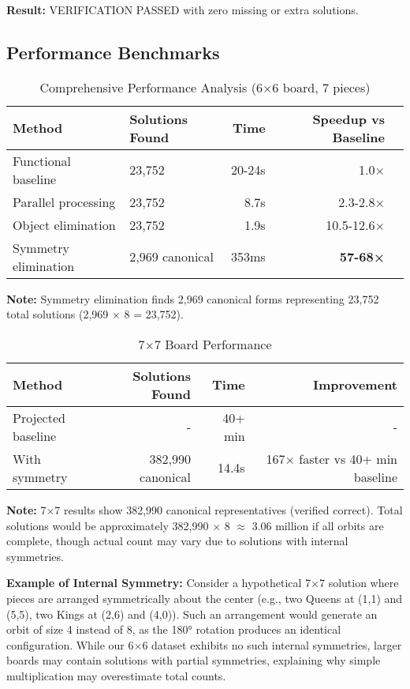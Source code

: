 \documentclass[12pt,a4paper]{article}
\theoremstyle{definition}
\begin{document}
\textbf{Result:} VERIFICATION PASSED with zero missing or extra solutions.

\subsection{Performance Benchmarks}

\begin{table}[h]
\centering
\caption{Comprehensive Performance Analysis (6$\times$6 board, 7 pieces)}
\begin{tabular}{@{}llrrr@{}}
\toprule
Method & Solutions Found & Time & Speedup vs Baseline \\
\midrule
Functional baseline & 23,752 & 20-24s & 1.0× \\
Parallel processing & 23,752 & 8.7s & 2.3-2.8× \\
Object elimination & 23,752 & 1.9s & 10.5-12.6× \\
Symmetry elimination & 2,969 canonical & 353ms & \textbf{57-68×} \\
\bottomrule
\end{tabular}
\end{table}

\textbf{Note:} Symmetry elimination finds 2,969 canonical forms representing 23,752 total solutions (2,969 × 8 = 23,752).

\begin{table}[h]
\centering
\caption{7$\times$7 Board Performance}
\begin{tabular}{@{}lrrr@{}}
\toprule
Method & Solutions Found & Time & Improvement \\
\midrule
Projected baseline & - & 40+ min & - \\
With symmetry & 382,990 canonical & 14.4s & 167× faster vs 40+ min baseline \\
\bottomrule
\end{tabular}
\end{table}

\textbf{Note:} 7$\times$7 results show 382,990 canonical representatives (verified correct). Total solutions would be approximately 382,990 $\times$ 8 $\approx$ 3.06 million if all orbits are complete, though actual count may vary due to solutions with internal symmetries.

\textbf{Example of Internal Symmetry:} Consider a hypothetical 7$\times$7 solution where pieces are arranged symmetrically about the center (e.g., two Queens at (1,1) and (5,5), two Kings at (2,6) and (4,0)). Such an arrangement would generate an orbit of size 4 instead of 8, as the 180° rotation produces an identical configuration. While our 6$\times$6 dataset exhibits no such internal symmetries, larger boards may contain solutions with partial symmetries, explaining why simple multiplication may overestimate total counts.
\end{document}
